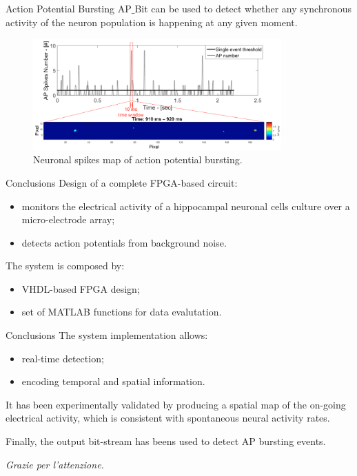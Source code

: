 \documentclass{beamer}
\begin{document}
\begin{frame}{Action Potential Bursting}
AP$\_$Bit can be used to detect whether any synchronous activity of the neuron population is happening at any given moment. 

\begin{figure}
             \includegraphics[width=0.85\textwidth]{images_Alice/action_potential_bursting.png}
                \caption{Neuronal spikes map of action potential bursting.}
                \label{fig:action_potential_bursting}
            \end{figure}
            

\end{frame}
\begin{frame}{Conclusions}
Design of a \alert{complete FPGA-based} circuit:
\begin{itemize}
    \item \alert{monitors} the electrical activity of a hippocampal neuronal cells culture over a micro-electrode array;
    \item \alert{detects} action potentials from background noise.
\end{itemize}
The system is composed by:
\begin{itemize}
    \item VHDL-based FPGA design;
    \item set of MATLAB functions for data evalutation.
\end{itemize}

\end{frame}
\begin{frame}{Conclusions}
The system implementation allows:
\begin{itemize}
    \item real-time detection;
    \item encoding temporal and spatial information.
\end{itemize}
\vspace{0.5cm}

It has been experimentally validated by producing a spatial map of the on-going electrical activity, which is consistent with spontaneous neural activity rates.
\vspace{0.5cm}

Finally, the output bit-stream has beens used to detect AP bursting events.


\end{frame}

\begin{frame}
\it{\LARGE Grazie per l'attenzione.}		
\end{frame}

\end{document}
